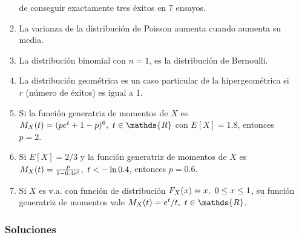 \documentclass[fleqn]{article}
\def\R{\mathds{R}}
\def\ss{\thinspace \thinspace}
\begin{document}
\begin{enumerate}
\begin{enumerate}
                                        de conseguir exactamente tres éxitos en 7 ensayos.
                                \item La varianza de la distribución de Poisson aumenta cuando aumenta su media.
                                \item La distribución binomial con $n=1$, es la distribución de Bernoulli.
                                \item La distribución geométrica es un caso particular de la hipergeométrica si $r$ (número de éxitos) es igual a 1.
                                \item Si la función generatriz de momentos de $X$ es $M_X(t) = (pe^t + 1 -p)^6, \ss t \in \R$ con $E[X] = 1.8$, 
                                        entonces $p=2$.
                                \item Si $E[X] = 2/3$ y la función generatriz de momentos de $X$ es $M_X(t) = \frac{p}{1-0.4e^t}, \ss t< -\ln 0.4$,
                                        entonces $p=0.6$.
                                \item Si $X$ es v.a. con función de distribución $F_X(x) = x, \ss 0 \leq x \leq 1$, su función generatriz de momentos
                                        vale $M_X(t) = e^t /t, \ss t \in \R$.
                        \end{enumerate}
                

                \newpage 

                \subsubsection{Soluciones}


\end{enumerate}
\end{document}
